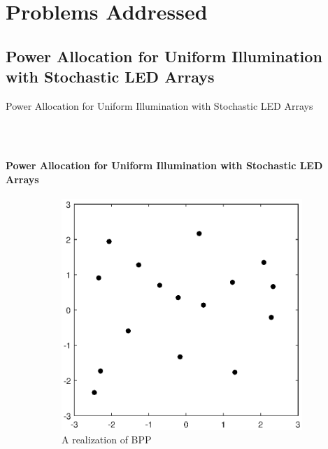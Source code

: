 \documentclass[slidestop,usepdftitle=false]{gvvslides}
\begin{document}
\section{Problems Addressed}
\subsection{Power Allocation for Uniform Illumination with Stochastic LED Arrays}

\begin{frame}
\vfill
Power Allocation for Uniform Illumination with Stochastic LED Arrays
\vfill
\end{frame}
\begin{frame}
\frametitle{\,}
\framesubtitle{Power Allocation for Uniform Illumination with
Stochastic LED Arrays}
\begin{figure}[t!]
    \centering
    \begin{subfigure}[t]{0.5\columnwidth}
        \centering
        \includegraphics[width=\columnwidth]{LedArrangementRandom}
        \caption{A realization of BPP}
\label{fig3:subfig1}        
    \end{subfigure}%
    ~ 
    \begin{subfigure}[t]{0.5\columnwidth}
        \centering

\end{subfigure}
\end{figure}
\end{frame}
\end{document}
